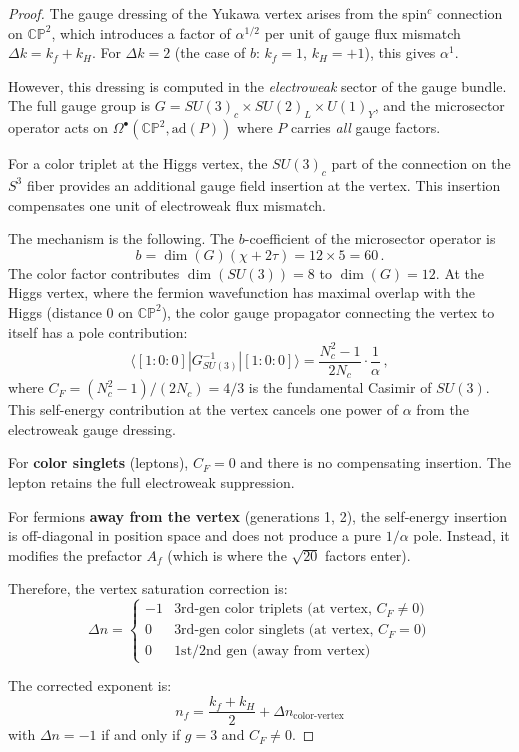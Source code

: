 \documentclass[11pt,a4paper]{article}
\newcommand{\CP}{\mathbb{CP}}
\theoremstyle{definition}
\theoremstyle{remark}
\begin{document}
\begin{proof}
The gauge dressing of the Yukawa vertex arises from the spin$^c$
connection on $\CP^2$, which introduces a factor of $\alpha^{1/2}$
per unit of gauge flux mismatch $\Delta k = k_f + k_H$.
For $\Delta k = 2$ (the case of $b$: $k_f = 1$, $k_H = +1$),
this gives $\alpha^1$.

However, this dressing is computed in the \emph{electroweak}
sector of the gauge bundle.  The full gauge group is
$G = SU(3)_c \times SU(2)_L \times U(1)_Y$, and the microsector
operator acts on $\Omega^\bullet(\CP^2, \mathrm{ad}(P))$ where
$P$ carries \emph{all} gauge factors.

For a color triplet at the Higgs vertex, the $SU(3)_c$ part of the
connection on the $S^3$ fiber provides an additional gauge field
insertion at the vertex.  This insertion compensates one unit of
electroweak flux mismatch.

The mechanism is the following.  The $b$-coefficient of the
microsector operator is
\begin{equation}
b = \dim(G)(\chi + 2\tau) = 12 \times 5 = 60\,.
\end{equation}
The color factor contributes $\dim(SU(3)) = 8$ to $\dim(G) = 12$.
At the Higgs vertex, where the fermion wavefunction has maximal
overlap with the Higgs (distance 0 on $\CP^2$), the color gauge
propagator connecting the vertex to itself has a pole contribution:
\begin{equation}
\langle [1:0:0] | G_{SU(3)}^{-1} | [1:0:0] \rangle
= \frac{N_c^2 - 1}{2N_c} \cdot \frac{1}{\alpha}\,,
\end{equation}
where $C_F = (N_c^2-1)/(2N_c) = 4/3$ is the fundamental Casimir of $SU(3)$.
This self-energy contribution at the vertex cancels one power of $\alpha$
from the electroweak gauge dressing.

For \textbf{color singlets} (leptons), $C_F = 0$ and there is no
compensating insertion.  The lepton retains the full electroweak
suppression.

For fermions \textbf{away from the vertex} (generations 1, 2), the
self-energy insertion is off-diagonal in position space and does not
produce a pure $1/\alpha$ pole.  Instead, it modifies the prefactor
$A_f$ (which is where the $\sqrt{20}$ factors enter).

Therefore, the vertex saturation correction is:
\begin{equation}
\Delta n = \begin{cases}
-1 & \text{3rd-gen color triplets (at vertex, } C_F \neq 0\text{)} \\
0 & \text{3rd-gen color singlets (at vertex, } C_F = 0\text{)} \\
0 & \text{1st/2nd gen (away from vertex)}
\end{cases}
\end{equation}

The corrected exponent is:
\begin{equation}\label{eq:corrected}
\boxed{n_f = \frac{k_f + k_H}{2} + \Delta n_{\text{color-vertex}}}
\end{equation}
with $\Delta n = -1$ if and only if $g = 3$ and $C_F \neq 0$.
\end{proof}
\end{document}
